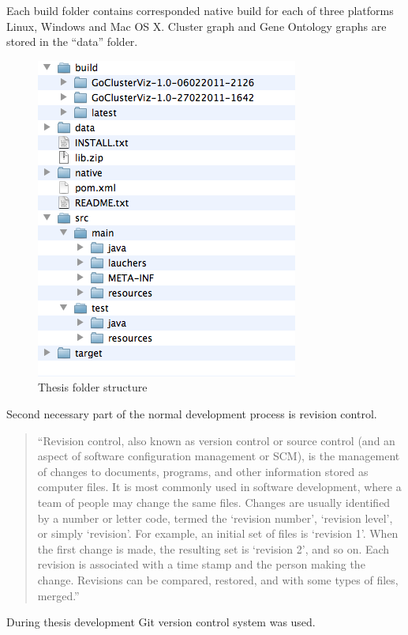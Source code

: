 Each build folder contains corresponded native build for each of three platforms Linux, Windows and Mac OS X. Cluster graph and Gene Ontology graphs are stored in the ``data'' folder.

\begin{figure}[h!]
\centering
\includegraphics[scale=0.6]{pictures/thesis_folder_structure.png}
\caption{Thesis folder structure}
\label{fig:THESIS_FOLDER_STRUCTURE}
\end{figure}

Second necessary part of the normal development process is revision control.

\begin{quotation}
``Revision control, also known as version control or source control (and an aspect of software configuration management or SCM),
is the management of changes to documents, programs, and other information stored as computer files.
It is most commonly used in software development, where a team of people may change the same files.
Changes are usually identified by a number or letter code, termed the `revision number', `revision level', or simply `revision'.
For example, an initial set of files is `revision 1'. When the first change is made, the resulting set is `revision 2', and so on.
Each revision is associated with a time stamp and the person making the change. Revisions can be compared,
restored, and with some types of files, merged.''~\cite{REVISION_CONTROL}
\end{quotation}

During thesis development Git version control system was used.

